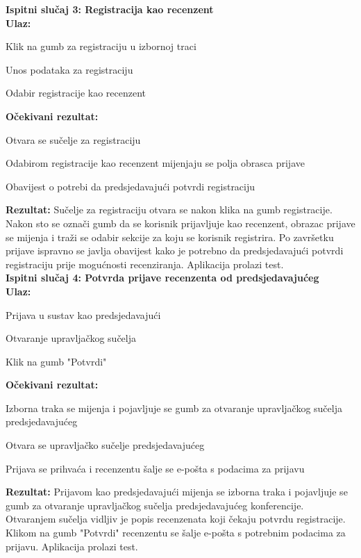 			
			 \noindent \textbf{Ispitni slučaj 3: Registracija kao recenzent}\\
			  \textbf{Ulaz:}
			 \begin{packed_enum}
			 	\item {Klik na gumb za registraciju u izbornoj traci}
			 	\item {Unos podataka za registraciju}
			 	\item {Odabir registracije kao recenzent}
			 \end{packed_enum}
			 \textbf{Očekivani rezultat:}
			 \begin{packed_enum}
			 	\item {Otvara se sučelje za registraciju}
			 	\item {Odabirom registracije kao recenzent mijenjaju se polja obrasca prijave}
			 	\item {Obavijest o potrebi da predsjedavajući potvrdi registraciju}
			 \end{packed_enum}
			  \textbf{Rezultat: }Sučelje za registraciju otvara se nakon klika na gumb registracije. Nakon sto se označi gumb da se korisnik prijavljuje kao recenzent, obrazac prijave se mijenja i traži se odabir sekcije za koju se korisnik registrira. Po završetku prijave ispravno se javlja obavijest kako je potrebno da predsjedavajući potvrdi registraciju prije mogućnosti recenziranja. {\color{green} Aplikacija prolazi test.}\\
			
			
			 \noindent \textbf{Ispitni slučaj 4: Potvrda prijave recenzenta od predsjedavajućeg}\\
			  \textbf{Ulaz:}
			 \begin{packed_enum}
			 	\item {Prijava u sustav kao predsjedavajući}
			 	\item {Otvaranje upravljačkog sučelja}
			 	\item {Klik na gumb "Potvrdi"}
			 \end{packed_enum}
			  \textbf{Očekivani rezultat:}
			 \begin{packed_enum}
			 	\item {Izborna traka se mijenja i pojavljuje se gumb za otvaranje upravljačkog sučelja predsjedavajućeg}
			 	\item {Otvara se upravljačko sučelje predsjedavajućeg}
			 	\item {Prijava se prihvaća i recenzentu šalje se e-pošta s podacima za prijavu}
			 \end{packed_enum}
			 \textbf{Rezultat: }Prijavom kao predsjedavajući mijenja se izborna traka i pojavljuje se gumb za otvaranje upravljačkog sučelja predsjedavajućeg konferencije. Otvaranjem sučelja vidljiv je popis recenzenata koji čekaju potvrdu registracije. Klikom na gumb "Potvrdi" recenzentu se šalje e-pošta s potrebnim podacima za prijavu. {\color{green} Aplikacija prolazi test.}\\
			\eject 
		
